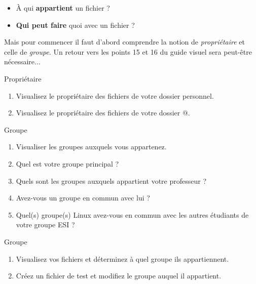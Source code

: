 \documentclass[a4paper,11pt]{article}
\begin{document}
\par

\begin{itemize}
	
	\item \`A qui \textbf{appartient} un fichier ?
	\item \textbf{Qui peut faire} quoi avec un fichier ?
\end{itemize}

Mais pour commencer il faut d'abord comprendre la notion de \textit{propri\'etaire}
et celle de \textit{groupe}. 
Un retour vers les points 15 et 16 du guide visuel sera peut-\^etre n\'ecessaire...  

\par

\newpage
\begin{Tutoriel}{Propriétaire}%
%
\begin{enumerate}
	
	\item 
	Visualisez le propri\'etaire des fichiers de votre dossier personnel.
	
	\item 
	Visualisez le propri\'etaire des fichiers de votre dossier @.
	
\end{enumerate}	
	
	\end{Tutoriel}


\begin{Tutoriel}{Groupe}%
\begin{enumerate}	
	\item Visualiser les groupes auxquels vous appartenez.
	\item Quel est votre groupe principal ? 
	\item Quels sont les groupes auxquels appartient votre professeur ?
	\item Avez-vous un groupe en commun avec lui ?
	\item Quel(s) groupe(s) Linux avez-vous en commun avec les autres \'etudiants de votre groupe ESI ?
\end{enumerate}	
		\end{Tutoriel}
	

\begin{Tutoriel}{Groupe}	
%
\begin{enumerate}
	
	\item Visualisez vos fichiers et d\'eterminez \`a quel groupe ils appartiennent.
	\item Cr\'eez un fichier de test et modifiez le groupe auquel il appartient.
\end{enumerate}
		\end{Tutoriel}
\end{document}
